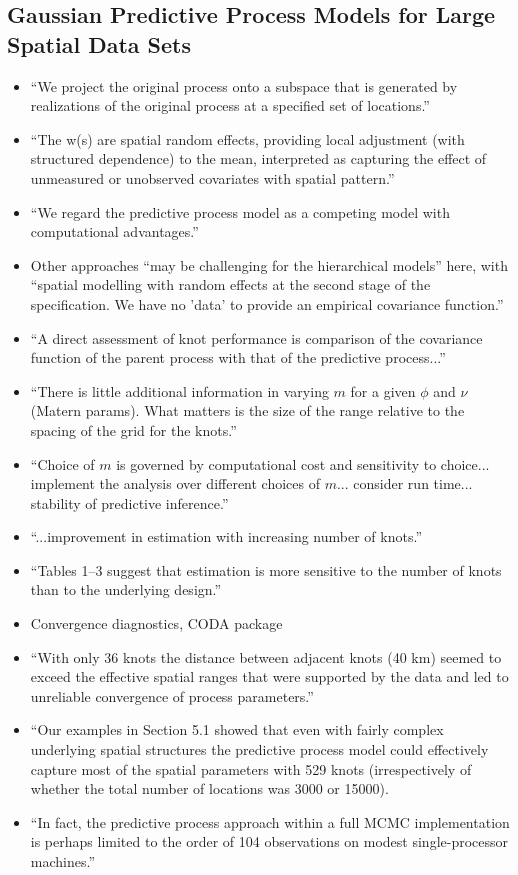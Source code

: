 \documentclass{article}
\begin{document}
\subsection*{Gaussian Predictive Process Models for Large Spatial Data Sets}
\citep{Banerjee2008}
\begin{itemize}
\item ``We project the original process onto a subspace that is generated by realizations of the original process at a specified set of locations.''
\item ``The w(s) are spatial random effects, providing local adjustment (with structured dependence) to the mean, interpreted as capturing the effect of unmeasured or unobserved covariates with spatial pattern.''
\item ``We regard the predictive process model as a competing model with computational advantages.''
\item Other approaches ``may be challenging for the hierarchical models'' here, with ``spatial modelling with random effects at the second stage of the specification. We have no 'data' to provide an empirical covariance function.''
\item ``A direct assessment of knot performance is comparison of the covariance function of the parent process with that of the predictive process...''
\item ``There is little additional information in varying $m$ for a given $\phi$ and $\nu$ (Matern params). What matters is the size of the range relative to the spacing of the grid for the knots.''
\item ``Choice of $m$ is governed by computational cost and sensitivity to choice... implement the analysis over different choices of $m$... consider run time... stability of predictive inference.''
\item ``...improvement in estimation with increasing number of knots.''
\item ``Tables 1--3 suggest that estimation is more sensitive to the number of knots than to the underlying design.''
\item Convergence diagnostics, CODA package
\item ``With only 36 knots the distance between adjacent knots (40 km) seemed to exceed the effective spatial ranges that were supported by the data and led to unreliable convergence of process parameters.''
\item ``Our examples in Section 5.1 showed that even with fairly complex underlying spatial structures the predictive process model could effectively capture most of the spatial parameters with 529 knots (irrespectively of whether the total number of locations was 3000 or 15000).
\item ``In fact, the predictive process approach within a full MCMC implementation is perhaps limited to the order of 104 observations on modest single-processor machines.''
\end{itemize}
\end{document}
